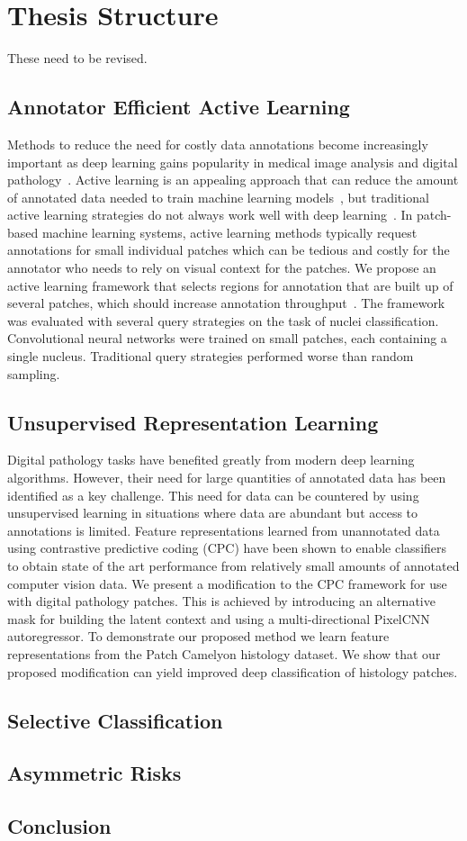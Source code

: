 \section{Thesis Structure}
\label{sec:thesis_structure}
These need to be revised.

\subsection*{Annotator Efficient Active Learning}
Methods to reduce the need for costly data annotations become increasingly important as deep learning gains popularity in medical image analysis and digital pathology~\citep{tizhoosh2018artificial}. Active learning is an appealing approach that can reduce the amount of annotated data needed to train machine learning models~\citep{settles2012active}, but traditional active learning strategies do not always work well with deep learning~\citep{wang2016cost}. In patch-based machine learning systems, active learning methods typically request annotations for small individual patches which can be tedious and costly for the annotator who needs to rely on visual context for the patches. We propose an active learning framework that selects regions for annotation that are built up of several patches, which should increase annotation throughput~\citep{carse2019active}. The framework was evaluated with several query strategies on the task of nuclei classification. Convolutional neural networks were trained on small patches, each containing a single nucleus. Traditional query strategies performed worse than random sampling.

\subsection*{Unsupervised Representation Learning}
Digital pathology tasks have benefited greatly from modern deep learning algorithms. However, their need for large quantities of annotated data has been identified as a key challenge. This need for data can be countered by using unsupervised learning in situations where data are abundant but access to annotations is limited. Feature representations learned from unannotated data using contrastive predictive coding (CPC) have been shown to enable classifiers to obtain state of the art performance from relatively small amounts of annotated computer vision data. We present a modification to the CPC framework for use with digital pathology patches. This is achieved by introducing an alternative mask for building the latent context and using a multi-directional PixelCNN autoregressor. To demonstrate our proposed method we learn feature representations from the Patch Camelyon histology dataset. We show that our proposed modification can yield improved deep classification of histology patches.

\subsection*{Selective Classification}

\subsection*{Asymmetric Risks}

\subsection*{Conclusion}
